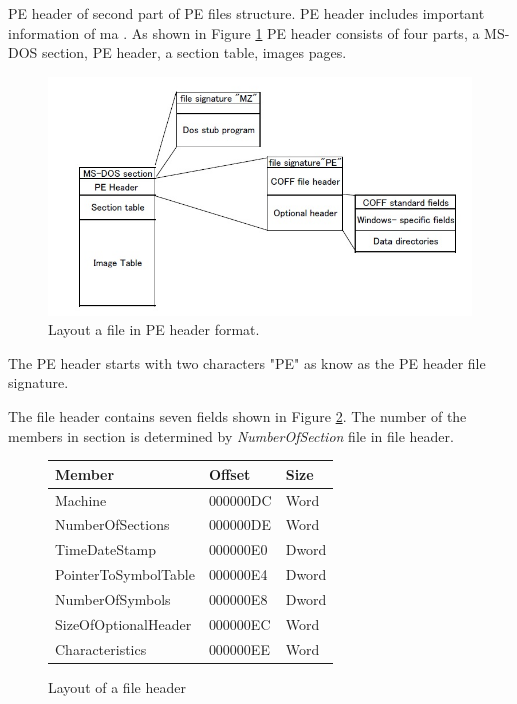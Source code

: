 PE header of second part of PE files structure. PE header includes important information of ma . As shown in Figure \ref{fig:peheader} PE header consists of four parts, a MS-DOS section, PE header, a section table, images pages.
\begin{figure}[httb]
\centering
\includegraphics[width=1\textwidth]{graph/peheader1.jpg}
\caption{Layout a file in PE header format.}
\label{fig:peheader}
\end{figure}

The PE header starts with two characters "PE" as know as the PE header file signature.

The file header contains seven fields shown in Figure \ref{fig:fileheader}. The number of the members in section is determined by \emph{NumberOfSection} file in file header. 

\begin{figure}[h!]
\begin{center}
\begin{tabular}{ l | l | l }
Member & Offset & Size\\ \hline
Machine & 000000DC & Word\\ 
NumberOfSections & 000000DE & Word\\ 
TimeDateStamp & 000000E0 & Dword\\ 
PointerToSymbolTable & 000000E4 & Dword\\ 
NumberOfSymbols & 000000E8 & Dword\\ 
SizeOfOptionalHeader & 000000EC & Word\\ 
Characteristics & 000000EE & Word\\
\end{tabular}
\end{center}
\caption{Layout of a file header}
\label{fig:fileheader}
\end{figure}

